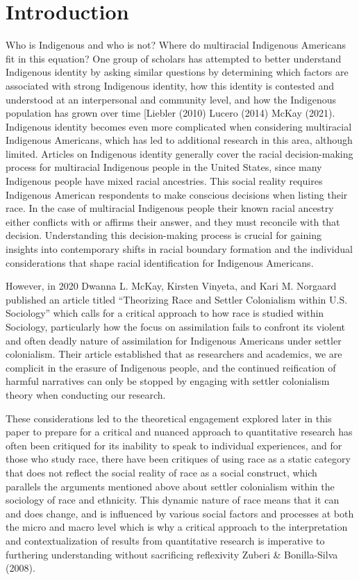 \documentclass[
  12pt,
  letterpaper,
]{article}
\begin{document}
\hypertarget{introduction}{%
\section{Introduction}\label{introduction}}

Who is Indigenous and who is not? Where do multiracial Indigenous
Americans fit in this equation? One group of scholars has attempted to
better understand Indigenous identity by asking similar questions by
determining which factors are associated with strong Indigenous
identity, how this identity is contested and understood at an
interpersonal and community level, and how the Indigenous population has
grown over time {[}Liebler (2010) Lucero (2014) McKay (2021). Indigenous
identity becomes even more complicated when considering multiracial
Indigenous Americans, which has led to additional research in this area,
although limited. Articles on Indigenous identity generally cover the
racial decision-making process for multiracial Indigenous people in the
United States, since many Indigenous people have mixed racial
ancestries. This social reality requires Indigenous American respondents
to make conscious decisions when listing their race. In the case of
multiracial Indigenous people their known racial ancestry either
conflicts with or affirms their answer, and they must reconcile with
that decision. Understanding this decision-making process is crucial for
gaining insights into contemporary shifts in racial boundary formation
and the individual considerations that shape racial identification for
Indigenous Americans.

However, in 2020 Dwanna L. McKay, Kirsten Vinyeta, and Kari M. Norgaard
published an article titled ``Theorizing Race and Settler Colonialism
within U.S. Sociology'' which calls for a critical approach to how race
is studied within Sociology, particularly how the focus on assimilation
fails to confront its violent and often deadly nature of assimilation
for Indigenous Americans under settler colonialism. Their article
established that as researchers and academics, we are complicit in the
erasure of Indigenous people, and the continued reification of harmful
narratives can only be stopped by engaging with settler colonialism
theory when conducting our research.

These considerations led to the theoretical engagement explored later in
this paper to prepare for a critical and nuanced approach to
quantitative research has often been critiqued for its inability to
speak to individual experiences, and for those who study race, there
have been critiques of using race as a static category that does not
reflect the social reality of race as a social construct, which
parallels the arguments mentioned above about settler colonialism within
the sociology of race and ethnicity. This dynamic nature of race means
that it can and does change, and is influenced by various social factors
and processes at both the micro and macro level which is why a critical
approach to the interpretation and contextualization of results from
quantitative research is imperative to furthering understanding without
sacrificing reflexivity Zuberi \& Bonilla-Silva (2008).
\end{document}
